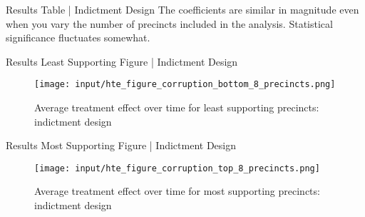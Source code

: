 \begin{frame}{Results Table | Indictment Design}
The coefficients are similar in magnitude even when you vary the number of precincts included in the analysis.
Statistical significance fluctuates somewhat.
    \begin{table}[H]
        \centering
        \caption{Comparison of Average Treatment Effects: Indictment Designs}
        \label{tab:att_comparison_corruption}
    \end{table}
\end{frame}

\begin{frame}{Results Least Supporting Figure | Indictment Design}
    \begin{figure}[ht]
        \centering
        \texttt{[image: input/hte\_figure\_corruption\_bottom\_8\_precincts.png]}
        \caption{Average treatment effect over time for least supporting precincts: indictment design}
        \label{fig:att_comparison_close_election_bottom}
    \end{figure}
\end{frame}

\begin{frame}{Results Most Supporting Figure | Indictment Design}
    \begin{figure}[ht]
        \centering
        \texttt{[image: input/hte\_figure\_corruption\_top\_8\_precincts.png]}
        \caption{Average treatment effect over time for most supporting precincts: indictment design}
        \label{fig:att_comparison_close_election_bottom}
    \end{figure}
\end{frame}

